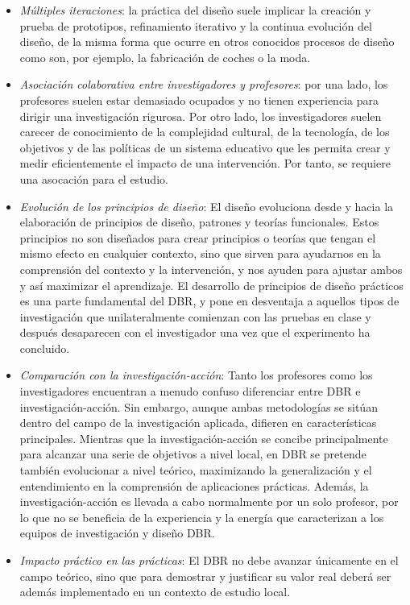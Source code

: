 \begin{itemize}
\item \emph{Múltiples iteraciones}: la práctica del diseño suele implicar la creación y prueba de prototipos, refinamiento iterativo y la continua evolución del diseño, de la misma forma que ocurre en otros conocidos procesos de diseño como son, por ejemplo, la fabricación de coches o la moda.
\item \emph{Asociación colaborativa entre investigadores y profesores}: por una lado, los profesores suelen estar demasiado ocupados y no tienen experiencia para dirigir una investigación rigurosa. Por otro lado, los investigadores suelen carecer de conocimiento de la complejidad cultural, de la tecnología, de los objetivos y de las políticas de un sistema educativo que les permita crear y medir eficientemente el impacto de una intervención. Por tanto, se requiere una asocación para el estudio.
\item \emph{Evolución de los principios de diseño}: El diseño evoluciona desde y hacia la elaboración de principios de diseño, patrones y teorías funcionales. Estos principios no son diseñados para crear principios o teorías que tengan el mismo efecto en cualquier contexto, sino que sirven para ayudarnos en la comprensión del contexto y la intervención, y nos ayuden para ajustar ambos y así maximizar el aprendizaje.  El desarrollo de principios de diseño prácticos es una parte fundamental del DBR, y pone en desventaja a aquellos tipos de investigación que unilateralmente comienzan con las pruebas en clase y después desaparecen con el investigador una vez que el experimento ha concluido.
\item \emph{Comparación con la investigación-acción}: Tanto los profesores como los investigadores encuentran a menudo confuso diferenciar entre DBR e investigación-acción. Sin embargo, aunque ambas metodologías se sitúan dentro del campo de la investigación aplicada, difieren en características principales. Mientras que la investigación-acción se concibe principalmente para alcanzar una serie de objetivos a nivel local, en DBR se pretende también evolucionar a nivel teórico, maximizando la generalización y el entendimiento en la comprensión de aplicaciones prácticas. Además, la investigación-acción es llevada a cabo normalmente por un solo profesor, por lo que no se beneficia de la experiencia y la energía que caracterizan a los equipos de investigación y diseño DBR.
\item \emph{Impacto práctico en las prácticas}: El DBR no debe avanzar únicamente en el campo teórico, sino que para demostrar y justificar su valor real deberá ser además implementado en un contexto de estudio local.
\end{itemize}

